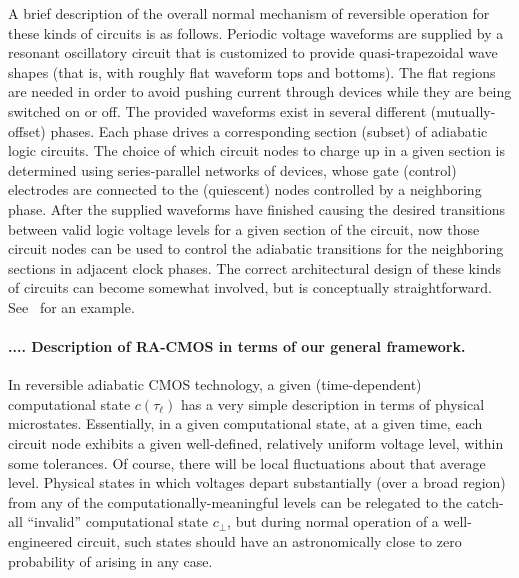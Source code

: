 \documentclass[preprints,article,accept,moreauthors,pdftex]{Definitions/mdpi}
\newcommand{\mypara}[1]{\paragraph{\arabic{section}.\arabic{subsection}.\arabic{subsubsection}.\arabic{paragraph}. #1}}
\begin{document}
\begin{paracol}{2}
A brief description of the overall normal mechanism of reversible operation for these kinds of circuits is as follows.  Periodic voltage waveforms are supplied by a resonant oscillatory circuit that is customized to provide quasi-trapezoidal wave shapes (that is, with roughly flat waveform tops and bottoms).  The flat regions are needed in order to avoid pushing current through devices while they are being switched on or off.  The provided waveforms exist in several different (mutually-offset) phases.  Each phase drives a corresponding section (subset) of adiabatic logic circuits.  The choice of which circuit nodes to charge up in a given section is determined using series-parallel networks of devices, whose gate (control) electrodes are connected to the (quiescent) nodes controlled by a neighboring phase.  After the supplied waveforms have finished causing the desired transitions between valid logic voltage levels for a given section of the circuit, now those circuit nodes can be used to control the adiabatic transitions for the neighboring sections in adjacent clock phases.  The correct architectural design of these kinds of circuits can become somewhat involved, but is conceptually straightforward. See~\cite{Fra+20b} for an example.

\mypara{Description of RA-CMOS in terms of our general framework.}

In reversible adiabatic CMOS technology, a given (time-dependent) computational state $c(\tau_\ell)$ has a very simple description in terms of physical microstates. Essentially, in a given computational state, at a given time, each circuit node exhibits a given well-defined, relatively uniform voltage level, within some tolerances. Of course, there will be local fluctuations about that average level. Physical states in which voltages depart substantially (over a broad region) from any of the computationally-meaningful levels can be relegated to the catch-all ``invalid'' computational state $c_\bot$, but during normal operation of a well-engineered circuit, such states should have an astronomically close to zero probability of arising in any case.


\end{paracol}
\end{document}
